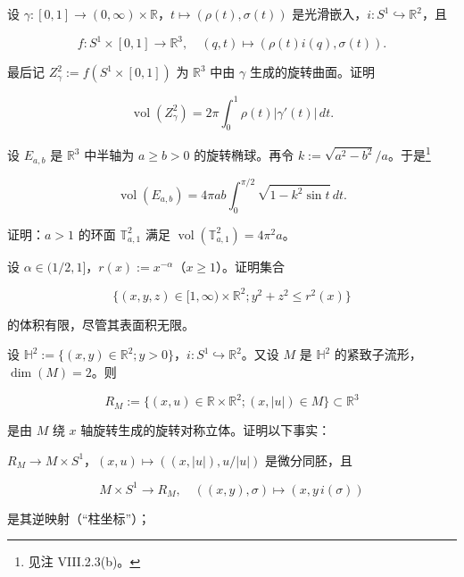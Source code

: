 \begin{exercises}
设 $ \gamma:[0,1]\to(0,\infty)\times\mathbb{R} $，$ t\mapsto(\rho(t),\sigma(t)) $ 是光滑嵌入，$ i:S^{1}\hookrightarrow\mathbb{R}^{2} $，且

\[
f:S^{1}\times[0,1]\to\mathbb{R}^{3},\quad (q,t)\mapsto(\rho(t)i(q),\sigma(t)).
\]

最后记 $ Z_{\gamma}^{2}:=f\left(S^{1}\times[0,1]\right) $ 为 $ \mathbb{R}^{3} $ 中由 $ \gamma $ 生成的旋转曲面。证明

\[
\operatorname{vol}(Z_{\gamma}^{2})=2\pi\int_{0}^{1}\rho(t)|\gamma'(t)|\,dt.
\]
\item

设 $ E_{a,b} $ 是 $ \mathbb{R}^{3} $ 中半轴为 $ a\ge b>0 $ 的旋转椭球。再令 $ k:=\sqrt{a^{2}-b^{2}}/a $。于是\footnote{见注 VIII.2.3(b)。}

\[
\operatorname{vol}(E_{a,b})=4\pi ab\int_{0}^{\pi/2}\sqrt{1-k^{2}\sin t}\,dt.
\]
\item

证明：$ a>1 $ 的环面 $ \mathbb{T}_{a,1}^{2} $ 满足 $ \operatorname{vol}(\mathbb{T}_{a,1}^{2})=4\pi^{2}a $。

\item

设 $ \alpha\in(1/2,1] $，$ r(x):=x^{-\alpha} $（$ x\ge 1 $）。证明集合

\[
\{(x,y,z)\in[1,\infty)\times\mathbb{R}^{2} ; y^{2}+z^{2}\le r^{2}(x)\}
\]

的体积有限，尽管其表面积无限。


\item

设 $ \mathbb{H}^{2}:=\{(x,y)\in\mathbb{R}^{2} ; y>0\} $，$ i:S^{1}\hookrightarrow\mathbb{R}^{2} $。又设 $ M $ 是 $ \mathbb{H}^{2} $ 的紧致子流形，$ \dim(M)=2 $。则

\[
R_{M}:=\{(x,u)\in\mathbb{R}\times\mathbb{R}^{2} ; (x,|u|)\in M\}\subset\mathbb{R}^{3}
\]

是由 $ M $ 绕 $ x $ 轴旋转生成的旋转对称立体。证明以下事实：

\begin{items}
\item

$ R_{M}\to M\times S^{1} $，$ (x,u)\mapsto((x,|u|),u/|u|) $ 是微分同胚，且

\[
M\times S^{1}\to R_{M},\quad ((x,y),\sigma)\mapsto(x,y\,i(\sigma))
\]

是其逆映射（“柱坐标”）；

\item


\end{items}
\end{exercises}
